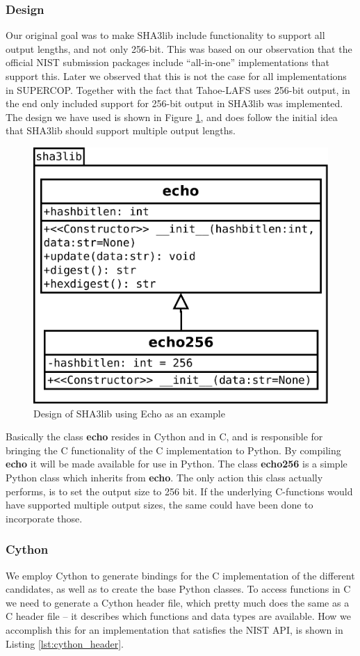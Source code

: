 \documentclass[english,12pt,a4paper]{book}
\begin{document}
\subsubsection{Design}

Our original goal was to make SHA3lib include functionality to support all
output lengths, and not only 256-bit. This was based on our observation that the
official \ac{NIST} submission packages include ``all-in-one'' implementations
that support this. Later we observed that this is not the case for all
implementations in \ac{SUPERCOP}. Together with the fact that Tahoe-\ac{LAFS}
uses 256-bit output, in the end only included support for 256-bit output in
SHA3lib was implemented. The design we have used is shown in Figure
\ref{fig:python:inheritance}, and does follow the initial idea that SHA3lib
should support multiple output lengths.

\begin{figure}[h!]
    \centering
    \includegraphics[width=0.6\columnwidth]{python-inheritance.pdf}
    \caption{Design of SHA3lib using Echo as an example}
    \label{fig:python:inheritance}
\end{figure}

Basically the class \textbf{echo} resides in Cython and in C, and is responsible
for bringing the C functionality of the C implementation to Python. By compiling
\textbf{echo} it will be made available for use in Python.  The class
\textbf{echo256} is a simple Python class which inherits from \textbf{echo}. The
only action this class actually performs, is to set the output size to 256 bit. If
the underlying C-functions would have supported multiple output sizes, the same
could have been done to incorporate those.

\subsubsection{Cython}
We employ Cython to generate bindings for the C implementation of the
different candidates, as well as to create the base Python classes. To access
functions in C we need to generate a Cython header file, which pretty much does
the same as a C header file -- it describes which functions and data types are
available. How we accomplish this for an implementation that satisfies the
\ac{NIST} \ac{API}, is shown in Listing \ref{lst:cython_header}.
\end{document}
